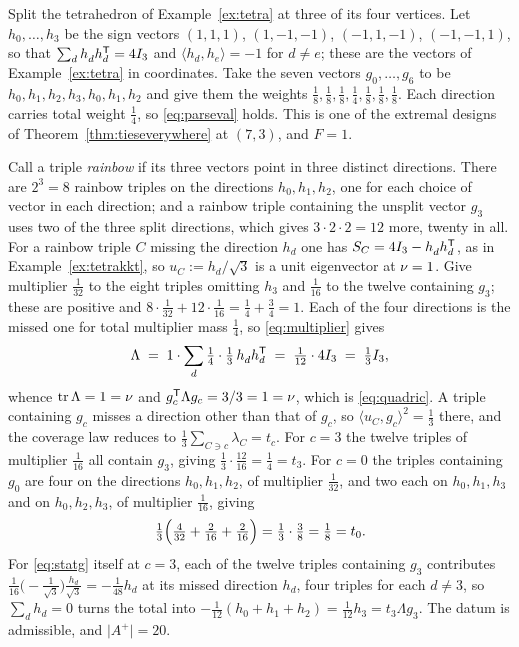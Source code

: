 \begin{example}\label{ex:splitseven}
Split the tetrahedron of Example~\ref{ex:tetra} at three of its four
vertices.  Let $h_0,\dots,h_3$ be the sign vectors $(1,1,1)$,
$(1,-1,-1)$, $(-1,1,-1)$, $(-1,-1,1)$, so that
$\sum_dh_d^{\vphantom{\mathsf{T}}}h_d\tp=4I_3$ and $\langle h_d,h_e\rangle=-1$
for $d\ne e$; these are the vectors of Example~\ref{ex:tetra} in
coordinates.  Take the seven vectors $g_0,\dots,g_6$ to be
$h_0,h_1,h_2,h_3,h_0,h_1,h_2$ and give them the weights
$\tfrac18,\tfrac18,\tfrac18,\tfrac14,\tfrac18,\tfrac18,\tfrac18$.  Each
direction carries total weight $\tfrac14$, so \eqref{eq:parseval} holds.
This is one of the extremal designs of
Theorem~\ref{thm:tieseverywhere} at $(7,3)$, and $F=1$.

Call a triple \emph{rainbow} if its three vectors point in three distinct
directions.  There are $2^3=8$ rainbow triples on the directions
$h_0,h_1,h_2$, one for each choice of vector in each direction; and a
rainbow triple containing the unsplit vector $g_3$ uses two of the three
split directions, which gives $3\cdot2\cdot2=12$ more, twenty in all.
For a rainbow triple $C$ missing the direction $h_d$ one has
$\SC=4I_3-h_d^{\vphantom{\mathsf{T}}}h_d\tp$, as in
Example~\ref{ex:tetrakkt}, so $u_C:=h_d/\sqrt3$ is a unit eigenvector at
$\nu=1$.  Give multiplier $\tfrac1{32}$ to the eight triples omitting $h_3$
and $\tfrac1{16}$ to the twelve containing $g_3$; these are positive and
$8\cdot\tfrac1{32}+12\cdot\tfrac1{16}=\tfrac14+\tfrac34=1$.  Each of the
four directions is the missed one for total multiplier mass $\tfrac14$,
so \eqref{eq:multiplier} gives
\[
  \Lambda\;=\;1\cdot\sum_{d}\tfrac14\cdot\tfrac13\,
    h_d^{\vphantom{\mathsf{T}}}h_d\tp\;=\;\tfrac1{12}\cdot4I_3
    \;=\;\tfrac13I_3 ,
\]
whence $\operatorname{tr}\Lambda=1=\nu$ and $g_c^{\mathsf{T}}\Lambda g_c=3/3=1=\nu$, which is
\eqref{eq:quadric}.  A triple containing $g_c$ misses a direction other
than that of $g_c$, so $\langle u_C,g_c\rangle^2=\tfrac13$ there, and the
coverage law reduces to $\tfrac13\sum_{C\ni c}\lambda_C=t_c$.  For $c=3$
the twelve triples of multiplier $\tfrac1{16}$ all contain $g_3$, giving
$\tfrac13\cdot\tfrac{12}{16}=\tfrac14=t_3$.  For $c=0$ the triples
containing $g_0$ are four on the directions $h_0,h_1,h_2$, of multiplier
$\tfrac1{32}$, and two each on $h_0,h_1,h_3$ and on $h_0,h_2,h_3$, of
multiplier $\tfrac1{16}$, giving
\[
  \tfrac13\Bigl(\tfrac4{32}+\tfrac2{16}+\tfrac2{16}\Bigr)
  =\tfrac13\cdot\tfrac38=\tfrac18=t_0 .
\]
For \eqref{eq:statg} itself at $c=3$, each of the twelve triples
containing $g_3$ contributes
$\tfrac1{16}\bigl(-\tfrac{1}{\sqrt3}\bigr)\tfrac{h_d}{\sqrt3}
=-\tfrac1{48}h_d$ at its missed direction $h_d$, four triples for each
$d\ne3$, so $\sum_dh_d=0$ turns the total into
$-\tfrac1{12}(h_0+h_1+h_2)=\tfrac1{12}h_3=t_3\Lambda g_3$.
The datum is admissible, and $\lvert A^{+}\rvert=20$.
\end{example}

